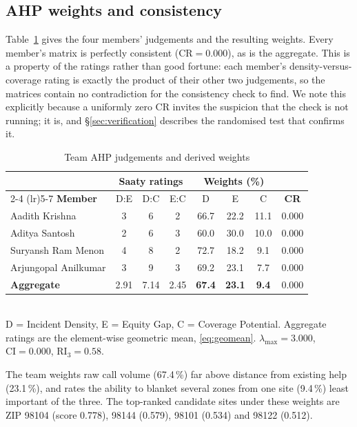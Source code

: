 \documentclass[conference]{IEEEtran}
\begin{document}
\subsection{AHP weights and consistency}

Table~\ref{tab:ahp} gives the four members' judgements and the resulting
weights. Every member's matrix is perfectly consistent
($\mathrm{CR} = 0.000$), as is the aggregate. This is a property of the ratings
rather than good fortune: each member's density-versus-coverage rating is
exactly the product of their other two judgements, so the matrices contain no
contradiction for the consistency check to find. We note this explicitly because
a uniformly zero CR invites the suspicion that the check is not running; it is,
and \S\ref{sec:verification} describes the randomised test that confirms it.

\begin{table}[htbp]
\caption{Team AHP judgements and derived weights}
\label{tab:ahp}
\centering
\small
\setlength{\tabcolsep}{3pt}
\begin{tabular}{@{}lccccccc@{}}
\toprule
& \multicolumn{3}{c}{\textbf{Saaty ratings}}
& \multicolumn{3}{c}{\textbf{Weights (\%)}} & \\
\cmidrule(lr){2-4} \cmidrule(lr){5-7}
\textbf{Member} & D:E & D:C & E:C & D & E & C & \textbf{CR} \\
\midrule
Aadith Krishna      & 3 & 6 & 2 & 66.7 & 22.2 & 11.1 & 0.000 \\
Aditya Santosh      & 2 & 6 & 3 & 60.0 & 30.0 & 10.0 & 0.000 \\
Suryansh Ram Menon  & 4 & 8 & 2 & 72.7 & 18.2 &  9.1 & 0.000 \\
Arjungopal Anilkumar & 3 & 9 & 3 & 69.2 & 23.1 &  7.7 & 0.000 \\
\midrule
\textbf{Aggregate}  & 2.91 & 7.14 & 2.45
                    & \textbf{67.4} & \textbf{23.1} & \textbf{9.4} & 0.000 \\
\bottomrule
\end{tabular}
\\[2pt]
\footnotesize D = Incident Density, E = Equity Gap, C = Coverage Potential.
Aggregate ratings are the element-wise geometric mean, \eqref{eq:geomean}.
$\lambda_{\max} = 3.000$, $\mathrm{CI} = 0.000$, $\mathrm{RI}_3 = 0.58$.
\end{table}

The team weights raw call volume (67.4\,\%) far above distance from existing
help (23.1\,\%), and rates the ability to blanket several zones from one site
(9.4\,\%) least important of the three. The top-ranked candidate sites under
these weights are ZIP 98104 (score 0.778), 98144 (0.579), 98101 (0.534) and
98122 (0.512).
\end{document}

